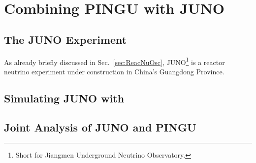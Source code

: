 \section{Combining PINGU with JUNO}
\label{sec:JUNO}


\subsection{The JUNO Experiment}
\label{sec:JUNO_exp}

As already briefly discussed in Sec.~\ref{sec:ReacNuOsc}, JUNO\footnote{Short
for Jiangmen Underground Neutrino Observatory.} is a reactor neutrino
experiment under construction in China's Guangdong Province.


\subsection{Simulating JUNO with \papa}
\label{sec:JUNO_sim}


\subsection{Joint Analysis of JUNO and PINGU}
\label{sec:JUNO_comb}
